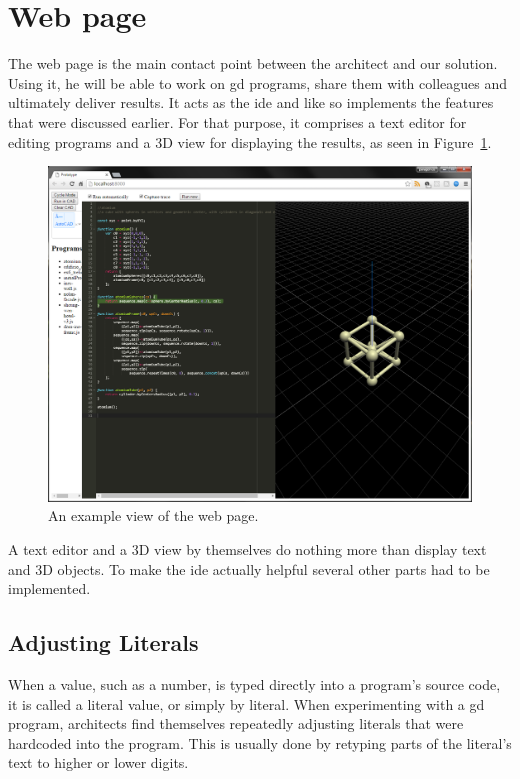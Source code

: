 \section{Web page}
The web page is the main contact point between the architect and our solution.
Using it, he will be able to work on \gls{gd} programs, share them with colleagues and ultimately deliver results.
It acts as the \gls{ide} and like so implements the features that were discussed earlier.
For that purpose, it comprises a text editor for editing programs and a 3D view for displaying the results, as seen in Figure~\ref{fig:page:view}.

\begin{figure}
  \centering
  \includegraphics[width=12cm]{./images/webpage_view}
  \caption{An example view of the web page.}
  \label{fig:page:view}
\end{figure}

A text editor and a 3D view by themselves do nothing more than display text and 3D objects.
To make the \gls{ide} actually helpful several other parts had to be implemented.

\subsection{Adjusting Literals}
When a value, such as a number, is typed directly into a program's source code, it is called a literal value, or simply by literal.
When experimenting with a \gls{gd} program, architects find themselves repeatedly adjusting literals that were hardcoded into the program.
This is usually done by retyping parts of the literal's text to higher or lower digits.

